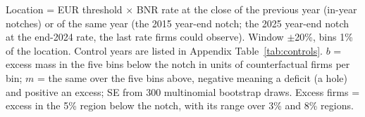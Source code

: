 \begin{table}[!tbp]
\begin{minipage}{0.95\linewidth}\vspace{2pt}\footnotesize Location = EUR threshold $\times$ BNR rate at the close of the previous year (in-year notches) or of the same year (the 2015 year-end notch; the 2025 year-end notch at the end-2024 rate, the last rate firms could observe). Window $\pm$20\%, bins 1\% of the location. Control years are listed in Appendix Table~\ref{tab:controls}. $b$ = excess mass in the five bins below the notch in units of counterfactual firms per bin; $m$ = the same over the five bins above, negative meaning a deficit (a hole) and positive an excess; SE from 300 multinomial bootstrap draws. Excess firms = excess in the 5\% region below the notch, with its range over 3\% and 8\% regions.\end{minipage}
\end{table}